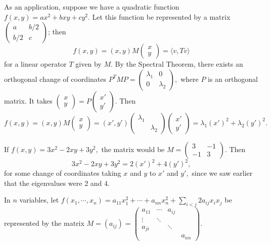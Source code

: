 As an application, suppose we have a quadratic function $f(x, y) = ax^2 + bxy + cy^2.$ Let this function be represented by a matrix 
$
\begin{pmatrix}
a & b/2 \\
b/2 & c
\end{pmatrix}$; then \[
f(x, y) = (x, y) M \begin{pmatrix}
x \\ y
\end{pmatrix} = \langle v, Tv \rangle
\]
for a linear operator $T$ given by $M.$ By the Spectral Theorem, there exists an orthogonal change of coordinates $P^TMP = \begin{pmatrix}
\lambda_1 & 0 \\ 0 & \lambda_2
\end{pmatrix},$ where $P$ is an orthogonal matrix. It takes $\begin{pmatrix}
x \\ y
\end{pmatrix} = P\begin{pmatrix}
x' \\ y'
\end{pmatrix}$. Then 
\[
f(x, y) = (x, y) M \begin{pmatrix}
x \\ y
\end{pmatrix} = (x', y') \begin{pmatrix}
\lambda_1 & \\ & \lambda_2
\end{pmatrix}\begin{pmatrix}
x'\\ y'
\end{pmatrix} = \lambda_1(x')^2 + \lambda_2(y')^2.
\]

\begin{example}

If $f(x, y) = 3x^2 - 2xy + 3y^2,$ the matrix would be $M = \begin{pmatrix}
3 & -1 \\ -1 & 3
\end{pmatrix}$. Then 
\[
3x^2 - 2xy + 3y^2 = 2(x')^2 + 4(y')^2,
\]
for some change of coordinates taking $x$ and $y$ to  $x'$ and $y',$ since we saw earlier that the eigenvalues were $2$ and $4.$ 

\end{example}

In $n$ variables, let $f(x_1, \cdots, x_n) = a_{11} x_1^2 + \cdots + a_{nn}x_n^2 + \sum_{i < j} 2a_{ij}x_ix_j$ be represented by the matrix $M = (a_{ij}) = \begin{pmatrix}
a_{11} & \cdots & a_{ij} & \\
\vdots & \ddots & & \\
a_{ji} & & \ddots& \\
& & & a_{nn}
\end{pmatrix}.$ %


